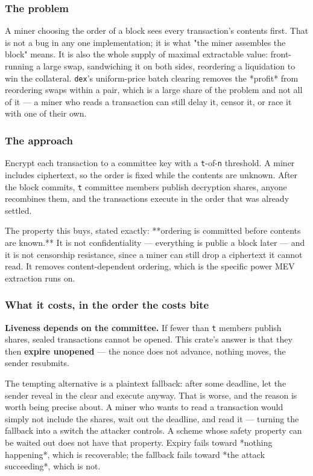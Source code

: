 \documentclass[11pt,a4paper]{article}
\begin{document}
\subsubsection{The problem}

A miner choosing the order of a block sees every transaction's contents
first. That is not a bug in any one implementation; it is what "the miner
assembles the block" means. It is also the whole supply of maximal
extractable value: front-running a large swap, sandwiching it on both sides,
reordering a liquidation to win the collateral. \texttt{dex}'s uniform-price batch
clearing removes the *profit* from reordering swaps within a pair, which is
a large share of the problem and not all of it — a miner who reads a
transaction can still delay it, censor it, or race it with one of their own.

\subsubsection{The approach}

Encrypt each transaction to a committee key with a \texttt{t}-of-\texttt{n} threshold. A
miner includes ciphertext, so the order is fixed while the contents are
unknown. After the block commits, \texttt{t} committee members publish decryption
shares, anyone recombines them, and the transactions execute in the order
that was already settled.

The property this buys, stated exactly: **ordering is committed before
contents are known.** It is not confidentiality — everything is public a
block later — and it is not censorship resistance, since a miner can still
drop a ciphertext it cannot read. It removes content-dependent ordering,
which is the specific power MEV extraction runs on.

\subsubsection{What it costs, in the order the costs bite}

\textbf{Liveness depends on the committee.} If fewer than \texttt{t} members publish
shares, sealed transactions cannot be opened. This crate's answer is that
they then \textbf{expire unopened} — the nonce does not advance, nothing moves,
the sender resubmits.

The tempting alternative is a plaintext fallback: after some deadline, let
the sender reveal in the clear and execute anyway. That is worse, and the
reason is worth being precise about. A miner who wants to read a transaction
would simply not include the shares, wait out the deadline, and read it —
turning the fallback into a switch the attacker controls. A scheme whose
safety property can be waited out does not have that property. Expiry fails
toward *nothing happening*, which is recoverable; the fallback fails toward
*the attack succeeding*, which is not.
\end{document}
